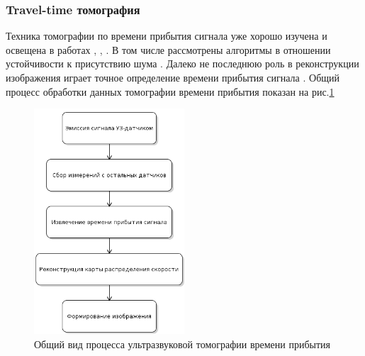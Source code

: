 \documentclass[14pt]{matmex-diploma}
\begin{document}
\subsubsection{Travel-time томография}
Техника томографии по времени прибытия сигнала уже хорошо изучена и освещена в работах \cite{Kunyansky2012111}, \cite{quan2007sound}, \cite{hopp2014breast}. В том числе рассмотрены алгоритмы в отношении устойчивости к присутствию шума \cite{hormati2010robust}. Далеко не последнюю роль в реконструкции изображения играет точное определение времени прибытия сигнала \cite{li2009improved}. Общий процесс обработки данных томографии времени прибытия показан на рис.\ref{fig:us_process} \\

\begin{figure}[h]
\centering
    \includegraphics[width=0.5\textwidth]{pics/us_process.png}
	\caption{Общий вид процесса ультразвуковой томографии времени прибытия}
	\label{fig:us_process}
\end{figure}
\end{document}
